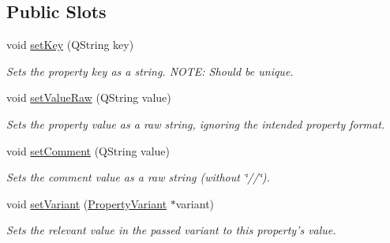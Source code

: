 \subsection*{Public Slots}
\begin{DoxyCompactItemize}
\item 
void \hyperlink{class_w_base_property_a8f799b2109e340ce459c34d3fba5ad7a}{set\-Key} (Q\-String key)
\begin{DoxyCompactList}\small\item\em Sets the property key as a string. N\-O\-T\-E\-: Should be unique. \end{DoxyCompactList}\item 
void \hyperlink{class_w_base_property_a43fcf4605167b151729d051d37f3fd1d}{set\-Value\-Raw} (Q\-String value)
\begin{DoxyCompactList}\small\item\em Sets the property value as a raw string, ignoring the intended property format. \end{DoxyCompactList}\item 
void \hyperlink{class_w_base_property_ac3512628c101c5ba985eeae43d13521e}{set\-Comment} (Q\-String value)
\begin{DoxyCompactList}\small\item\em Sets the comment value as a raw string (without \char`\"{}//\char`\"{}). \end{DoxyCompactList}\item 
void \hyperlink{class_w_base_property_ab8f5c0a4a0e0bc255930cac48269364a}{set\-Variant} (\hyperlink{class_property_variant}{Property\-Variant} $\ast$variant)
\begin{DoxyCompactList}\small\item\em Sets the relevant value in the passed variant to this property's value. \end{DoxyCompactList}\end{DoxyCompactItemize}
